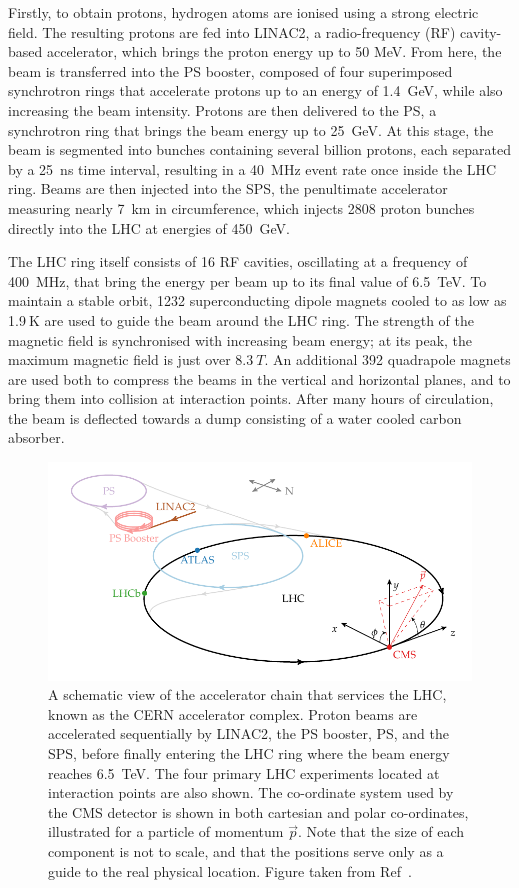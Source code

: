 Firstly, to obtain protons, hydrogen atoms are ionised using a strong electric field. The resulting protons are fed into LINAC2, a radio-frequency (RF) cavity-based accelerator, which brings the proton energy up to 50 MeV. From here, the beam is transferred into the PS booster, composed of four superimposed synchrotron rings that accelerate protons up to an energy of 1.4~GeV, while also increasing the beam intensity. Protons are then delivered to the PS, a synchrotron ring that brings the beam energy up to 25~GeV. At this stage, the beam is segmented into bunches containing several billion protons, each separated by a 25~ns time interval, resulting in a 40~MHz event rate once inside the LHC ring. Beams are then injected into the SPS, the penultimate accelerator measuring nearly 7~km in circumference, which injects 2808 proton bunches directly into the LHC at energies of 450~GeV. 

The LHC ring itself consists of 16 RF cavities, oscillating at a frequency of 400~MHz, that bring the energy per beam up to its final value of 6.5~TeV. To maintain a stable orbit, 1232 superconducting dipole magnets cooled to as low as 1.9$~\mathrm{K}$ are used to guide the beam around the LHC ring. The strength of the magnetic field is synchronised with increasing beam energy; at its peak, the maximum magnetic field is just over ${\SI{8.3}{T}}$.  An additional 392 quadrapole magnets are used both to compress the beams in the vertical and horizontal planes, and to bring them into collision at interaction points. After many hours of circulation, the beam is deflected towards a dump consisting of a water cooled carbon absorber.
    
\begin{figure}[htbp!]
\centering
\includegraphics[width =0.9\linewidth]{Figures/Detector/LHC/lhc_complex.pdf}\hfill%
\caption[The CERN accelerator complex.]{A schematic view of the accelerator chain that services the LHC, known as the CERN accelerator complex. Proton beams are accelerated sequentially by LINAC2, the PS booster, PS, and the SPS, before finally entering the LHC ring where the beam energy reaches 6.5~TeV. The four primary LHC experiments located at interaction points are also shown. The co-ordinate system used by the CMS detector is shown in both cartesian and polar co-ordinates, illustrated for a particle of momentum $\vec{p}$. Note that the size of each component is not to scale, and that the positions serve only as a guide to the real physical location. Figure taken from Ref~\cite{shane_thesis}.}
\label{fig:det_cern_accelerator_complex}
\end{figure}

